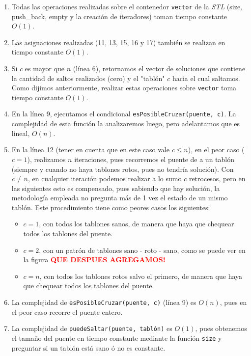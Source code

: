 \begin{enumerate}
  \item Todas las operaciones realizadas sobre el contenedor \verb|vector| de la \textit{STL} (size, push_back, empty y la creación de iteradores)
  toman tiempo constante $O(1)$.

  \item Las asignaciones realizadas (11, 13, 15, 16 y 17) también se realizan en tiempo constante $O(1)$.

  \item Si $c$ es mayor que $n$ (línea 6), retornamos el vector de soluciones que contiene la cantidad de saltos realizados (cero) y
  el "tablón" $c$ hacia el cual saltamos. Como dijimos anteriormente, realizar estas operaciones sobre \verb|vector|
  toma tiempo constante $O(1)$.

  \item En la línea 9, ejecutamos el condicional \verb|esPosibleCruzar(puente, c)|. La complejidad de esta función la
  analizaremos luego, pero adelantamos que es lineal, $O(n)$.

  \item En la línea 12 (tener en cuenta que en este caso vale $c \leq n$), en el peor caso ($c = 1$), realizamos $n$ iteraciones,
  pues recorremos el puente de a un tablón (siempre y cuando no haya tablones rotos, pues no tendría solución). Con $c \neq n$,
  en cualquier iteración podemos realizar a lo sumo $c$ retrocesos, pero en las siguientes esto es compensado, pues sabiendo que
  hay solución, la metodología empleada no pregunta más de 1 vez el estado de un mismo tablón. Este procedimiento tiene como peores
  casos los siguientes:
  \begin{itemize}
    \item $c = 1$, con todos los tablones sanos, de manera que haya que chequear todos los tablones del puente.

    \item $c = 2$, con un patrón de tablones sano - roto - sano, como se puede ver en la figura \textcolor{red}{\textbf{QUE DESPUES AGREGAMOS!}}

    \item $c = n$, con todos los tablones rotos salvo el primero, de manera que haya que chequear todos los tablones del puente.
  \end{itemize}

  \item La complejidad de \verb|esPosibleCruzar(puente, c)| (línea 9) es $O(n)$, pues en el peor caso recorre el puente entero.

  \item La complejidad de \verb|puedeSaltar(puente, tablón)| es $O(1)$, pues obtenemos el tamaño del puente en tiempo constante
  mediante la función \verb|size| y preguntar si un tablón está sano ó no es constante.

\end{enumerate}

